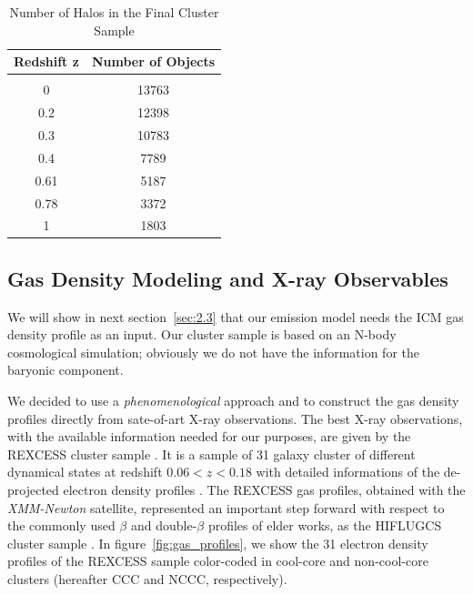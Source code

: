 \documentclass[traditabstract]{aa}
\begin{document}
\begin{table}[hbt!]
\begin{center}
\caption{Number of Halos in the Final Cluster Sample}
\medskip
\begin{tabular}{cc}
\hline
\phantom{\Big|}
Redshift z & Number of Objects \\
\hline\\[-0.5em]
 0 &  13763\\
 0.2 &  12398\\
 0.3 &  10783\\ 
 0.4 &   7789\\ 
 0.61 &  5187\\ 
 0.78 &  3372\\ 
 1 &  1803\\[0.5em]
\hline
\end{tabular}
\label{tab:z}
\end{center}
\end{table}


\subsection{Gas Density Modeling and X-ray Observables}
\label{sec:2.2}
We will show in next section~\ref{sec:2.3} that our emission model needs the ICM gas density profile as an input.
Our cluster sample is based on an N-body cosmological simulation; obviously we do not have the information for the baryonic component.

We decided to use a \emph{phenomenological} approach and to construct the gas density profiles directly from sate-of-art X-ray observations.
The best X-ray observations, with the available information needed for our purposes, are given by the REXCESS cluster sample \citep{2008A&A...487..431C,2009A&A...498..361P}. It is a sample of 31 galaxy cluster of different dynamical states at redshift $0.06<z<0.18$ with detailed informations of the de-projected electron density 
profiles \citep{2008A&A...487..431C}. The REXCESS gas profiles, obtained with the \emph{XMM-Newton} satellite, represented an 
important step forward with respect to the commonly used $\beta$ and double-$\beta$ profiles of elder works, as the HIFLUGCS cluster sample \citep{2002ApJ...567..716R}.
In figure~\ref{fig:gas_profiles}, we show the 31 electron density profiles of the REXCESS sample color-coded in cool-core and non-cool-core clusters (hereafter CCC and NCCC, respectively).
\end{document}
